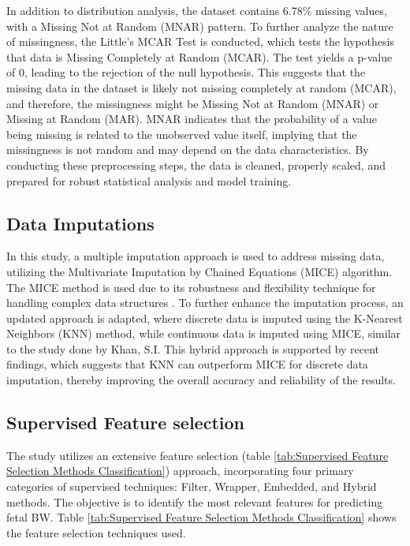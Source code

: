 \documentclass[12pt]{article}
\begin{document}
In addition to distribution analysis, the dataset contains 6.78\% missing values, with a Missing Not at Random (MNAR) pattern. To further analyze the nature of missingness, the Little's MCAR Test is conducted, which tests the hypothesis that data is Missing Completely at Random (MCAR). The test yields a p-value of 0, leading to the rejection of the null hypothesis. This suggests that the missing data in the dataset is likely not missing completely at random (MCAR), and therefore, the missingness might be Missing Not at Random (MNAR) or Missing at Random (MAR).  MNAR indicates that the probability of a value being missing is related to the unobserved value itself, implying that the missingness is not random and may depend on the data characteristics. By conducting these preprocessing steps, the data is cleaned, properly scaled, and prepared for robust statistical analysis and model training.

\subsection{Data Imputations}

In this study, a multiple imputation approach is used to address missing data, utilizing the Multivariate Imputation by Chained Equations (MICE) algorithm. The MICE method is used due to its robustness and flexibility technique for handling complex data structures \cite{8A}. To further enhance the imputation process, an updated approach is adapted, where discrete data is imputed using the K-Nearest Neighbors (KNN) method, while continuous data is imputed using MICE, similar to the study done by Khan, S.I\cite{22A}. This hybrid approach is supported by recent findings, which suggests that KNN can outperform MICE for discrete data imputation, thereby improving the overall accuracy and reliability of the results.

\subsection{Supervised Feature selection}

The study utilizes an extensive feature selection (table \ref{tab:Supervised Feature Selection Methods Classification}) approach, incorporating four primary categories of supervised techniques: Filter, Wrapper, Embedded, and Hybrid methods. The objective is to identify the most relevant features for predicting fetal BW. Table \ref{tab:Supervised Feature Selection Methods Classification} shows the feature selection techniques used. 
\end{document}
